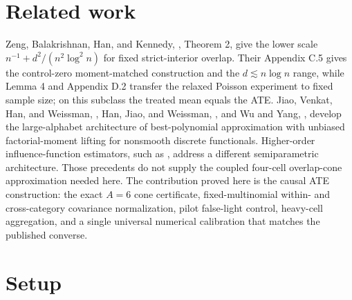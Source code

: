 \documentclass{article}
\begin{document}
\section{Related work}

Zeng, Balakrishnan, Han, and Kennedy, \cite{ZengBalakrishnanHanKennedy2024}, Theorem 2, give the lower scale \(n^{-1}+d^2/(n^2\log^2 n)\) for fixed strict-interior overlap. Their Appendix C.5 gives the control-zero moment-matched construction and the \(d\lesssim n\log n\) range, while Lemma 4 and Appendix D.2 transfer the relaxed Poisson experiment to fixed sample size; on this subclass the treated mean equals the ATE. Jiao, Venkat, Han, and Weissman, \cite{JiaoVenkatHanWeissman2015}, Han, Jiao, and Weissman, \cite{HanJiaoWeissman2020}, and Wu and Yang, \cite{WuYang2016}, develop the large-alphabet architecture of best-polynomial approximation with unbiased factorial-moment lifting for nonsmooth discrete functionals. Higher-order influence-function estimators, such as \cite{LiuMukherjeeNeweyRobins2017}, address a different semiparametric architecture. Those precedents do not supply the coupled four-cell overlap-cone approximation needed here. The contribution proved here is the causal ATE construction: the exact \(A=6\) cone certificate, fixed-multinomial within- and cross-category covariance normalization, pilot false-light control, heavy-cell aggregation, and a single universal numerical calibration that matches the published converse.

\section{Setup}
\end{document}
